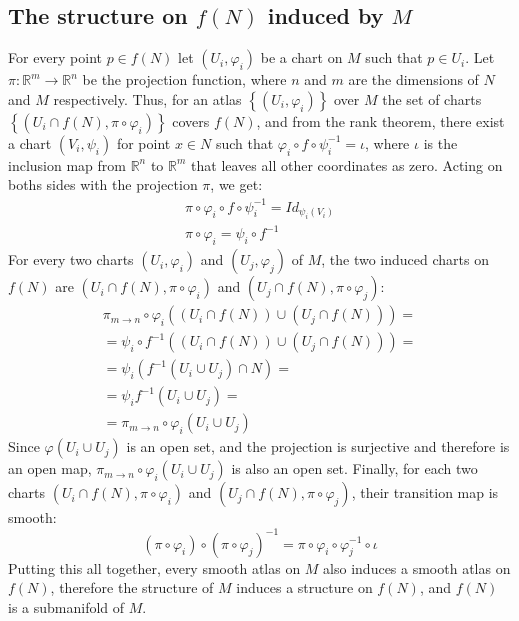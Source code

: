 \documentclass{article}
\newcommand{\R}{\ensuremath{\mathbb{R}}}
\begin{document}
\subsection*{The structure on $f(N)$ induced by $M$}
For every point $p \in f(N)$ let $\left(U_i, \varphi_i\right)$ be a chart on $M$ such that $p \in U_i$. Let $\pi: \R^{m} \rightarrow \R^{n}$ be the projection function, where $n$ and $m$ are the dimensions of $N$ and $M$ respectively.
Thus, for an atlas $\left\{\left(U_i, \varphi_i\right)\right\}$ over $M$ the set of charts $\left\{\left(U_i \cap f(N), \pi \circ \varphi_i\right)\right\}$ covers $f(N)$, and from the rank theorem, there exist a chart $\left(V_i, \psi_i\right)$ for point $x \in N$ such that $\varphi_i \circ f \circ \psi_i^{-1} = \iota$, where $\iota$ is the inclusion map from $\R^n$ to $\R^m$ that leaves all other coordinates as zero. Acting on boths sides with the projection $\pi$, we get:
\begin{equation}
\begin{gathered}
    \pi \circ \varphi_i \circ f \circ \psi_i^{-1} = Id_{\psi_i(V_i)}
    \\
    \pi \circ \varphi_i = \psi_i \circ f^{-1}
\end{gathered}
\end{equation}
For every two charts $\left(U_i, \varphi_i\right)$ and $\left(U_j, \varphi_j\right)$ of $M$, the two induced charts on $f(N)$ are $\left(U_i \cap f(N), \pi\circ\varphi_i\right)$ and $\left(U_j \cap f(N), \pi\circ\varphi_j\right)$:
\begin{equation}
\begin{gathered}
    \pi_{m\rightarrow n}\circ\varphi_i \left(\left(U_i \cap f(N)\right)\cup\left(U_j \cap f(N)\right)\right) = 
    \\
    = \psi_i \circ f^{-1} \left(\left(U_i \cap f(N)\right)\cup\left(U_j \cap f(N)\right)\right) =
    \\
    = \psi_i  \left(f^{-1}\left(U_i \cup U_j\right)\cap N\right) = 
    \\
    = \psi_i f^{-1}\left(U_i \cup U_j\right) = 
    \\
    = \pi_{m\rightarrow n}\circ\varphi_i \left(U_i \cup U_j\right) 
\end{gathered}
\end{equation}
Since $\varphi(U_i \cup U_j)$ is an open set, and the projection is surjective and therefore is an open map, $\pi_{m\rightarrow n}\circ\varphi_i \left(U_i \cup U_j\right)$ is also an open set.
Finally, for each two charts $\left(U_i \cap f(N), \pi \circ \varphi_i\right)$ and $\left(U_j \cap f(N), \pi \circ \varphi_j\right)$, their transition map is smooth:
\begin{equation}
    \left(\pi \circ \varphi_i\right) \circ \left(\pi \circ \varphi_j\right)^{-1} = 
    \pi \circ \varphi_i \circ \varphi_j^{-1} \circ \iota
\end{equation}
Putting this all together, every smooth atlas on $M$ also induces a smooth atlas on $f(N)$, therefore the structure of $M$ induces a structure on $f(N)$, and $f(N)$ is a submanifold of $M$.
\end{document}
